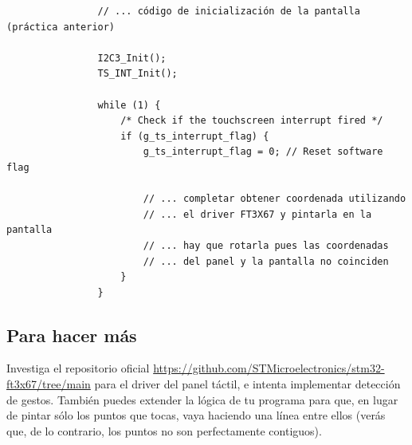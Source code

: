 \documentclass[../main.tex]{subfiles}
\begin{document}
            \begin{lstlisting}
                // ... código de inicialización de la pantalla (práctica anterior)
                
                I2C3_Init();
                TS_INT_Init();
                
                while (1) {
                    /* Check if the touchscreen interrupt fired */
                    if (g_ts_interrupt_flag) {
                        g_ts_interrupt_flag = 0; // Reset software flag

                        // ... completar obtener coordenada utilizando
                        // ... el driver FT3X67 y pintarla en la pantalla
                        // ... hay que rotarla pues las coordenadas 
                        // ... del panel y la pantalla no coinciden
                    }
                }
            \end{lstlisting}

    \subsection{Para hacer más} 
        Investiga el repositorio oficial \url{https://github.com/STMicroelectronics/stm32-ft3x67/tree/main} para el driver del panel táctil, e intenta implementar detección de gestos. También puedes extender la lógica de tu programa para que, en lugar de pintar sólo los puntos que tocas, vaya haciendo una línea entre ellos (verás que, de lo contrario, los puntos no son perfectamente contiguos).
\end{document}
